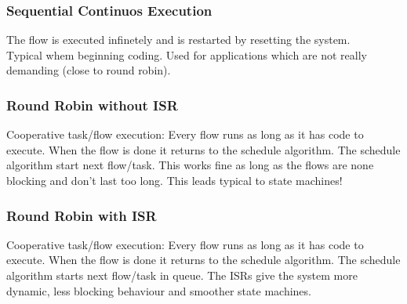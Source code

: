 \subsubsection{Sequential Continuos Execution}
\begin{paracol}{2}
  The flow is executed infinetely and is restarted by resetting the system.\\
  Typical whem beginning coding. Used for applications which are not really demanding (close to round robin).
  \switchcolumn
  
\end{paracol}

\subsubsection{Round Robin without ISR}
\begin{paracol}{2}
  Cooperative task/flow execution: Every flow runs as long as it has code to execute.
  When the flow is done it returns to the schedule algorithm.
  The schedule algorithm start next flow/task.\newline
  This works fine as long as the flows are none blocking and don’t last too long.
  This leads typical to state machines!\newline
  
  \switchcolumn
  
\end{paracol}

\subsubsection{Round Robin with ISR}
Cooperative task/flow execution: Every flow runs as long as it has code to execute.
When the flow is done it returns to the schedule algorithm.
The schedule algorithm starts next flow/task in queue.
The ISRs give the system more dynamic, less blocking behaviour and smoother state machines.
\begin{paracol}{2}
  
  \switchcolumn
  
\end{paracol}


